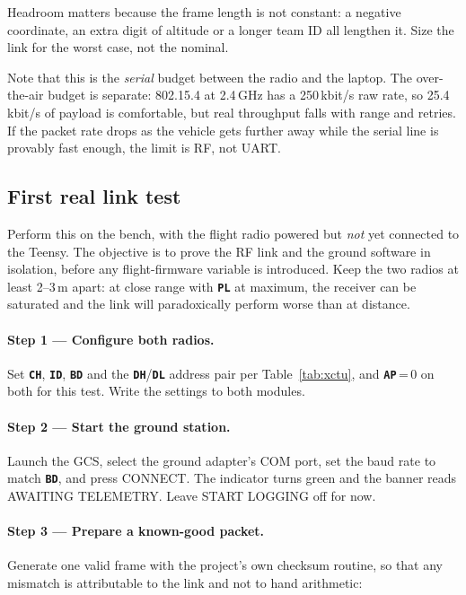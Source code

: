 \documentclass[11pt,a4paper]{article}
\newcommand{\param}[1]{\textbf{\texttt{#1}}}
\begin{document}
Headroom matters because the frame length is not constant: a negative
coordinate, an extra digit of altitude or a longer team ID all lengthen it.
Size the link for the worst case, not the nominal.

Note that this is the \emph{serial} budget between the radio and the laptop.
The over-the-air budget is separate: 802.15.4 at 2.4\,GHz has a 250\,kbit/s
raw rate, so 25.4\,kbit/s of payload is comfortable, but real throughput
falls with range and retries. If the packet rate drops as the vehicle gets
further away while the serial line is provably fast enough, the limit is RF,
not UART.

\subsection{First real link test}
\label{sec:firstlink}

Perform this on the bench, with the flight radio powered but \emph{not} yet
connected to the Teensy. The objective is to prove the RF link and the ground
software in isolation, before any flight-firmware variable is introduced.
Keep the two radios at least 2--3\,m apart: at close range with \param{PL}
at maximum, the receiver can be saturated and the link will paradoxically
perform worse than at distance.

\paragraph{Step 1 --- Configure both radios.}
Set \param{CH}, \param{ID}, \param{BD} and the \param{DH}/\param{DL} address
pair per Table~\ref{tab:xctu}, and \param{AP}\,=\,0 on both for this test.
Write the settings to both modules.

\paragraph{Step 2 --- Start the ground station.}
Launch the GCS, select the ground adapter's COM port, set the baud rate to
match \param{BD}, and press \textsf{CONNECT}. The indicator turns green and
the banner reads \textsf{AWAITING TELEMETRY}. Leave \textsf{START LOGGING}
off for now.

\paragraph{Step 3 --- Prepare a known-good packet.}
Generate one valid frame with the project's own checksum routine, so that any
mismatch is attributable to the link and not to hand arithmetic:
\end{document}
